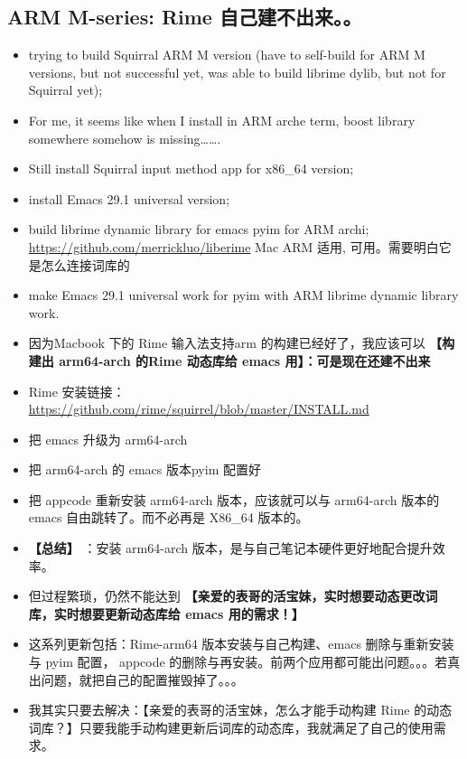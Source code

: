 \documentclass[9pt, b5paper]{article}
\begin{document}
\subsection{ARM M-series: Rime 自己建不出来。。}
\label{sec-1-6}
\begin{itemize}
\item trying to build Squirral ARM M version (have to self-build for ARM M versions, but not successful yet, was able to build librime dylib, but not for Squirral yet);
\item For me, it seems like when I install in ARM arche term, boost library somewhere somehow is missing\ldots{}\ldots{}.
\item Still install Squirral input method app for x86\_64 version;
\item install Emacs 29.1 universal version;
\item build librime dynamic library for emacs pyim for ARM archi; \url{https://github.com/merrickluo/liberime} Mac ARM 适用, 可用。需要明白它是怎么连接词库的
\item make Emacs 29.1 universal work for pyim with ARM librime dynamic library work.
\item 因为Macbook 下的 Rime 输入法支持arm 的构建已经好了，我应该可以 \textbf{【构建出 arm64-arch 的Rime 动态库给 emacs 用】：可是现在还建不出来}
\item Rime 安装链接：\url{https://github.com/rime/squirrel/blob/master/INSTALL.md}
\item 把 emacs 升级为 arm64-arch
\item 把 arm64-arch 的 emacs 版本pyim 配置好
\item 把 appcode 重新安装 arm64-arch 版本，应该就可以与 arm64-arch 版本的 emacs 自由跳转了。而不必再是 X86\_64 版本的。
\item \textbf{【总结】} ：安装 arm64-arch 版本，是与自己笔记本硬件更好地配合提升效率。
\item 但过程繁琐，仍然不能达到 \textbf{【亲爱的表哥的活宝妹，实时想要动态更改词库，实时想要更新动态库给 emacs 用的需求！】}
\item 这系列更新包括：Rime-arm64 版本安装与自己构建、emacs 删除与重新安装与 pyim 配置， appcode 的删除与再安装。前两个应用都可能出问题。。。若真出问题，就把自己的配置摧毁掉了。。。
\item 我其实只要去解决：【亲爱的表哥的活宝妹，怎么才能手动构建 Rime 的动态词库？】只要我能手动构建更新后词库的动态库，我就满足了自己的使用需求。
\begin{itemize}

\end{itemize}
\end{itemize}
\end{document}
